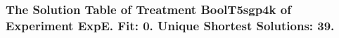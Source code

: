  \begin{frame}
 \fontsize{8pt}{9pt}\selectfont
 \frametitle{ The Solution Table of Treatment BoolT5sgp4k of Experiment ExpE. Fit: 0. Unique Shortest Solutions: 39. }

 \label{ExpESolutionTable007.tex}  
 \end{frame}


